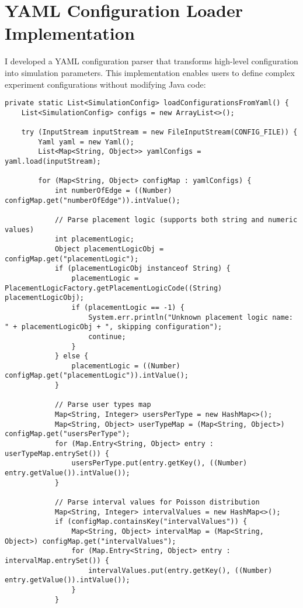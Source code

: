\chapter{YAML Configuration Loader Implementation}
\label{appendix:yaml-loader}

I developed a YAML configuration parser that transforms high-level configuration into simulation parameters. This implementation enables users to define complex experiment configurations without modifying Java code:

\begin{verbatim}
private static List<SimulationConfig> loadConfigurationsFromYaml() {
    List<SimulationConfig> configs = new ArrayList<>();

    try (InputStream inputStream = new FileInputStream(CONFIG_FILE)) {
        Yaml yaml = new Yaml();
        List<Map<String, Object>> yamlConfigs = yaml.load(inputStream);

        for (Map<String, Object> configMap : yamlConfigs) {
            int numberOfEdge = ((Number) configMap.get("numberOfEdge")).intValue();
            
            // Parse placement logic (supports both string and numeric values)
            int placementLogic;
            Object placementLogicObj = configMap.get("placementLogic");
            if (placementLogicObj instanceof String) {
                placementLogic = PlacementLogicFactory.getPlacementLogicCode((String) placementLogicObj);
                if (placementLogic == -1) {
                    System.err.println("Unknown placement logic name: " + placementLogicObj + ", skipping configuration");
                    continue;
                }
            } else {
                placementLogic = ((Number) configMap.get("placementLogic")).intValue();
            }

            // Parse user types map
            Map<String, Integer> usersPerType = new HashMap<>();
            Map<String, Object> userTypeMap = (Map<String, Object>) configMap.get("usersPerType");
            for (Map.Entry<String, Object> entry : userTypeMap.entrySet()) {
                usersPerType.put(entry.getKey(), ((Number) entry.getValue()).intValue());
            }
            
            // Parse interval values for Poisson distribution
            Map<String, Integer> intervalValues = new HashMap<>();
            if (configMap.containsKey("intervalValues")) {
                Map<String, Object> intervalMap = (Map<String, Object>) configMap.get("intervalValues");
                for (Map.Entry<String, Object> entry : intervalMap.entrySet()) {
                    intervalValues.put(entry.getKey(), ((Number) entry.getValue()).intValue());
                }
            }


\end{verbatim}
